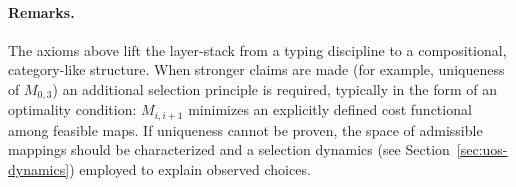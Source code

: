 \paragraph{Remarks.}
The axioms above lift the layer-stack from a typing discipline to a compositional, category-like structure.
When stronger claims are made (for example, uniqueness of $M_{0,3}$) an additional selection principle is
required, typically in the form of an optimality condition: $M_{i,i+1}$ minimizes an explicitly defined cost
functional among feasible maps. If uniqueness cannot be proven, the space of admissible mappings should be
characterized and a selection dynamics (see Section~\ref{sec:uos-dynamics}) employed to explain observed choices.

